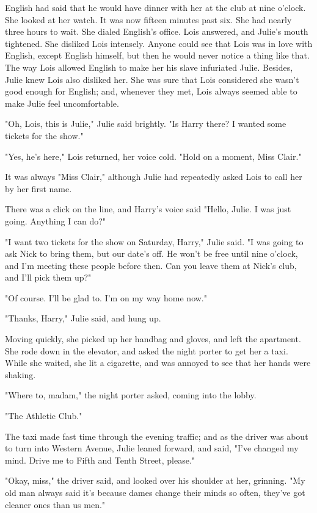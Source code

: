 \documentclass{novel}
\begin{document}
English had said that he would have dinner with her at the club at nine o'clock. She looked at her watch. It was now fifteen minutes past six. She had nearly three hours to wait. She dialed English's office. Lois answered, and Julie's mouth tightened. She disliked Lois intensely. Anyone could see that Lois was in love with English, except English himself, but then he would never notice a thing like that. The way Lois allowed English to make her his slave infuriated Julie. Besides, Julie knew Lois also disliked her. She was sure that Lois considered she wasn't good enough for English; and, whenever they met, Lois always seemed able to make Julie feel uncomfortable.

"Oh, Lois, this is Julie," Julie said brightly. "Is Harry there? I wanted some tickets for the show."

"Yes, he's here," Lois returned, her voice cold. "Hold on a moment, Miss Clair."

It was always "Miss Clair," although Julie had repeatedly asked Lois to call her by her first name.

There was a click on the line, and Harry's voice said "Hello, Julie. I was just going. Anything I can do?"

"I want two tickets for the show on Saturday, Harry," Julie said. "I was going to ask Nick to bring them, but our date's off. He won't be free until nine o'clock, and I'm meeting these people before then. Can you leave them at Nick's club, and I'll pick them up?"

"Of course. I'll be glad to. I'm on my way home now."

"Thanks, Harry," Julie said, and hung up.

Moving quickly, she picked up her handbag and gloves, and left the apartment. She rode down in the elevator, and asked the night porter to get her a taxi. While she waited, she lit a cigarette, and was annoyed to see that her hands were shaking.

"Where to, madam," the night porter asked, coming into the lobby.

"The Athletic Club."

The taxi made fast time through the evening traffic; and as the driver was about to turn into Western Avenue, Julie leaned forward, and said, "I've changed my mind. Drive me to Fifth and Tenth Street, please."

"Okay, miss," the driver said, and looked over his shoulder at her, grinning. "My old man always said it's because dames change their minds so often, they've got cleaner ones than us men."
\end{document}
